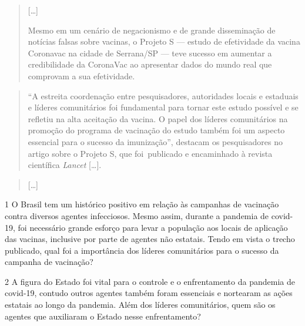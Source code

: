\begin{quote}
{[}\ldots{}{]}

Mesmo em um cenário de negacionismo e de grande disseminação de notícias
falsas sobre vacinas, o Projeto S --- estudo de efetividade da vacina
Coronavac na cidade de Serrana/SP --- teve sucesso em aumentar a
credibilidade da CoronaVac ao apresentar dados do mundo real que
comprovam a sua efetividade.
\end{quote}

\begin{quote}
``A estreita coordenação entre pesquisadores, autoridades locais e
estaduais e líderes comunitários foi fundamental para tornar este estudo
possível e se refletiu na alta aceitação da vacina. O papel dos líderes
comunitários na promoção do programa de vacinação do estudo também foi
um aspecto essencial para o sucesso da imunização'', destacam os
pesquisadores no artigo sobre o Projeto S, que foi~publicado e
encaminhado à revista científica \emph{Lancet} {[}\ldots{}{]}.
\end{quote}

\begin{quote}
{[}\ldots{}{]}
\end{quote}


\num{1} O Brasil tem um histórico positivo em relação às campanhas de
vacinação contra diversos agentes infecciosos. Mesmo assim, durante a
pandemia de covid-19, foi necessário grande esforço para levar a
população aos locais de aplicação das vacinas, inclusive por parte de
agentes não estatais. Tendo em vista o trecho publicado, qual foi a
importância dos líderes comunitários para o sucesso da campanha de
vacinação?


\num{2} A figura do Estado foi vital para o controle e o enfrentamento
da pandemia de covid-19, contudo outros agentes também foram essenciais
e nortearam as ações estatais ao longo da pandemia. Além dos líderes
comunitários, quem são os agentes que auxiliaram o Estado nesse
enfrentamento?

